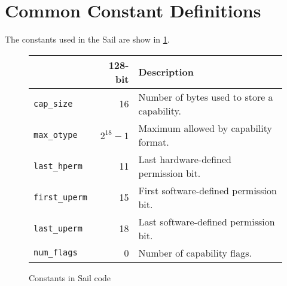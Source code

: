 \section{Common Constant Definitions}

The constants used in the Sail are show in \cref{table:pseudocode-constants}.

\begin{figure}
\begin{center}
\begin{tabular}{lrl}
\toprule
 & 128-bit & Description \\
\midrule
\verb+cap_size+ & 16 & Number of bytes used to store a capability. \\
\verb+max_otype+ & $2^{18}-1$ & Maximum \cotype{} allowed by capability format. \\
\verb+last_hperm+ & 11 & Last hardware-defined permission bit. \\
\verb+first_uperm+ & 15 & First software-defined permission bit. \\
\verb+last_uperm+ & 18 & Last software-defined permission bit. \\
\verb+num_flags+ & 0 & Number of capability flags. \\
\bottomrule
\end{tabular}
\end{center}

\caption{Constants in Sail code}
\label{table:pseudocode-constants}
\end{figure}

%
%

%
%
%

